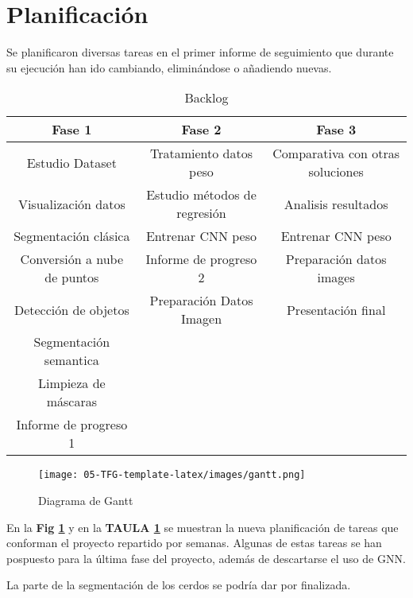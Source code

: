 \documentclass[12pt,a4paper]{article}
\begin{document}
\section{Planificación}

Se planificaron diversas tareas en el primer informe de seguimiento que durante su ejecución han ido cambiando, eliminándose o añadiendo nuevas.

\begin{table}[!]
 \centering
\begin{tabular}{|c|c|c|}
\hline
\textbf{Fase 1}             & \textbf{Fase 2}              & \textbf{Fase 3}                  \\ \hline
Estudio Dataset             & Tratamiento datos peso       & Comparativa con otras soluciones \\
Visualización datos         & Estudio métodos de regresión & Analisis resultados              \\
Segmentación clásica        & Entrenar CNN peso            & Entrenar CNN peso                \\
Conversión a nube de puntos & Informe de progreso 2        & Preparación datos images         \\
Detección de objetos        & Preparación Datos Imagen     & Presentación final               \\
Segmentación semantica      &                              &                                  \\
Limpieza de máscaras        &                              &                                  \\
Informe de progreso 1       &                              &                                  \\ \hline
\end{tabular}
\caption{Backlog}
\label{backlog}
\end{table}

\begin{figure}[h]
\centering
\texttt{[image: 05-TFG-template-latex/images/gantt.png]}
\caption{Diagrama de Gantt}
\label{gant}
\end{figure}


En la \textbf{Fig \ref{gant}} y en la \textbf{TAULA \ref{backlog}} se muestran la nueva planificación de tareas que conforman el proyecto repartido por semanas.
Algunas de estas tareas se han pospuesto para la última fase del proyecto, además de descartarse el uso de GNN.

La parte de la segmentación de los cerdos se podría dar por finalizada.
\end{document}
